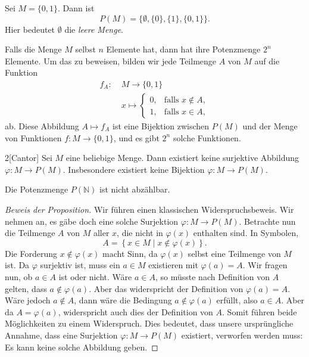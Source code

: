 \documentclass[../main.tex]{subfiles}
\begin{document}
\begin{example}
  Sei $M = \{0, 1\}$. Dann ist
  \[
    P(M) = \{ \emptyset, \{0\}, \{1\}, \{0, 1\}\}.
  \]
  Hier bedeutet $\emptyset$ die \textit{leere Menge}.
\end{example}

\begin{remark}
  Falls die Menge $M$ selbst $n$ Elemente hat, dann hat ihre
  Potenzmenge $2^{n}$ Elemente. Um das zu beweisen,
  bilden wir jede Teilmenge $A$ von $M$
  auf die Funktion
  \begin{align*}
    f_{A} \colon \;& M \to \{0, 1\} \\
    & x \mapsto
      \begin{cases}
        0, & \mbox{falls } x \notin A, \\
        1, & \mbox{falls } x \in A,
      \end{cases}
  \end{align*}
  ab.
  Diese Abbildung $A \mapsto f_{A}$ ist eine Bijektion zwischen
  $P(M)$ und der Menge von Funktionen $f \colon M \to \{0, 1\}$,
  und es gibt $2^{n}$
  solche Funktionen.
\end{remark}

\begin{manualproposition}{2}[Cantor]\label{prop:cantor}
  Sei $M$ eine beliebige Menge.
  Dann existiert keine surjektive Abbildung $\varphi \colon M \to P(M)$.
  Insbesondere existiert keine Bijektion $\varphi \colon M \to P(M)$.
\end{manualproposition}

\begin{corollary}
  Die Potenzmenge $P(\mathbb N)$ ist nicht abzählbar.
\end{corollary}

\begin{proof}[Beweis der Proposition]
  Wir führen einen klassischen Widerspruchsbeweis.
  Wir nehmen an, es gäbe doch eine solche Surjektion
  $\varphi \colon M \to P(M)$.
  Betrachte nun die Teilmenge $A$ von $M$ aller $x$, die nicht
  in $\varphi(x)$ enthalten sind. In Symbolen,
  \[
    A = \left\{x \in M \mid x \notin \varphi(x)\right\}.
  \]
  Die Forderung $x \notin \varphi(x)$ macht Sinn,
  da $\varphi(x)$ selbst eine Teilmenge von $M$ ist.
  Da $\varphi$ surjektiv ist, muss ein $a \in M$
  existieren mit $\varphi(a) = A$. Wir fragen nun,
  ob $a \in A$ ist oder nicht.
  Wäre $a \in A$, so müsste nach Definition von $A$
  gelten, dass $a \notin \varphi(a)$. Aber das
  widerspricht der Definition von $\varphi(a) = A$.
  Wäre jedoch $a \notin A$, dann wäre die Bedingung
  $a \notin \varphi(a)$ erfüllt, also $a \in A$.
  Aber da $A = \varphi(a)$, widerspricht auch dies
  der Definition von $A$. Somit führen beide Möglichkeiten
  zu einem Widerspruch. Dies bedeutet, dass unsere
  ursprüngliche Annahme, dass eine Surjektion
  $\varphi \colon M \to P(M)$ existiert, verworfen werden muss:
  Es kann keine solche Abbildung geben.
\end{proof}
\end{document}

